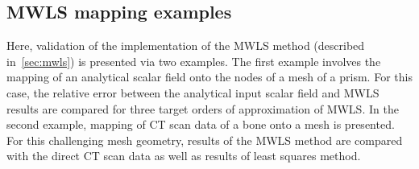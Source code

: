 \documentclass[review]{elsarticle}
\numberwithin{equation}{section}
\begin{document}
\subsection{MWLS mapping examples}
\label{sec:mals_mapping}
Here, validation of the implementation of the MWLS method (described in~\ref{sec:mwls}) is presented via two examples.
The first example involves the mapping of an analytical scalar field onto the nodes of a mesh of a prism.
For this case, the relative error between the analytical input scalar field and MWLS results are compared for three target orders of approximation of MWLS.
In the second example, mapping of CT scan data of a bone onto a mesh is presented.
For this challenging mesh geometry, results of the MWLS method are compared with the direct CT scan data as well as results of least squares method.
    
\end{document}

